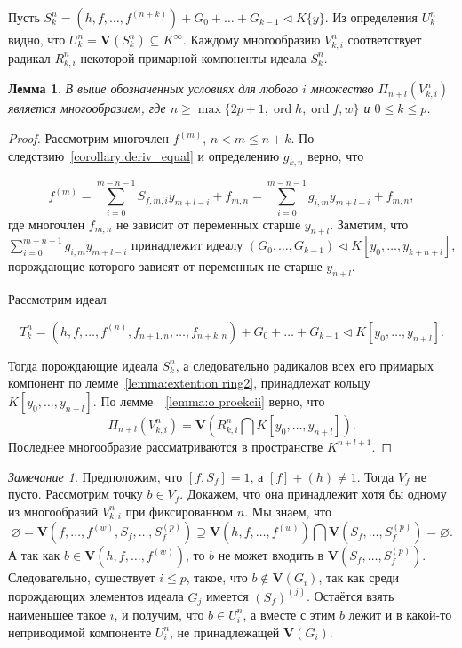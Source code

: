 \documentclass[16pt]{article}
\DeclareMathOperator{\ord}{ord}
\renewcommand{\le}{\leqslant} %
\renewcommand{\ge}{\geqslant} %
\theoremstyle{plain1}
\newtheorem{lemma}[theorem1]{Лемма}
\theoremstyle{plain2}
\theoremstyle{plain}
\theoremstyle{plain3}
\theoremstyle{definition}
\theoremstyle{remark}
\newtheorem{remark}[theorem1]{Замечание}
\begin{document}
Пусть  $S_k^n=\left(h,f,\ldots,f^{(n+k)}\right)+G_0+\ldots+ G_{k-1}\triangleleft K\{y\}$. Из определения ${U}_k^n$ видно, что ${U}_k^n=\mathbf{V}(S_k^n)\subseteq K^{\infty}$. Каждому многообразию ${V}_{k,i}^n$ соответствует радикал $R_{k,i}^n$ некоторой примарной компоненты идеала $S_k^n$.


\begin{lemma} \label{lemma:o_ideale}
 В выше обозначенных условиях для любого $i$ множество $\Pi_{n+l}({V}_{k,i}^n)$ является многообразием, где $n \ge\max\{ 2p+1,\ord{h},\ord{f},w\}$ и  $0\le k\le p$.
\end{lemma}

\begin{proof}
Рассмотрим многочлен $f^{(m)}$, $n<m\le n+k$. По следствию~\ref{corollary:deriv_equal} и определению $g_{k,n}$ верно, что

$$
f^{(m)}= \sum\limits_{i=0}^{m-n-1} S_{f,m,i}y_{m+l -i} + f_{m,n}=\sum\limits_{i=0}^{m-n-1} g_{i,m}y_{m+l -i} + f_{m,n},
$$
где многочлен $f_{m,n}$ не зависит от переменных старше $y_{n+l}$. Заметим, что $\sum\limits_{i=0}^{m-n-1} g_{i,m}y_{m+l -i}$ принадлежит идеалу  $(G_0,\ldots, G_{k-1})\triangleleft K[y_0,\ldots,y_{k+n+l}]$,  порождающие которого зависят от переменных не старше $y_{n+l}$.

Рассмотрим идеал

$$
T_k^n=(h,f,\ldots,f^{(n)},f_{n+1,n},\ldots,f_{n+k,n}) + G_0+\ldots+ G_{k-1}\triangleleft K[y_0,\ldots,y_{n+l}].
$$

Тогда порождающие идеала $S_k^n$, а следовательно радикалов всех его примарых компонент по лемме~\ref{lemma:extention ring2}, принадлежат кольцу $K[y_0,\ldots,y_{n+l}]$. По лемме~~\ref{lemma:o proekcii} верно, что
$$
\Pi_{n+l}({V}_{k,i}^n)=\mathbf{V}(R_{k,i}^n\bigcap K[y_0,\ldots,y_{n+l}]).
$$
Последнее многообразие рассматриваются в пространстве $K^{n+l+1}$.
\end{proof}


\begin{remark}\label{remark:o_prinadleznosti_reshenia}
Предположим, что $[f,S_f]=1$, а $[f]+(h)\neq 1$. Тогда ${V}_{f}$ не пусто. Рассмотрим точку $b\in{V}_{f}$. Докажем, что она принадлежит хотя бы одному из многообразий ${V}_{k,i}^n$ при фиксированном $n$. Мы знаем, что 
$$
\varnothing=\mathbf{V}\left(f,\ldots,f^{(w)},S_f,\ldots,S_f^{(p)}\right)\supseteq \mathbf{V}\left(h,f,\ldots,f^{(w)}\right)\bigcap\mathbf{V}\left(S_f,\ldots,S_f^{(p)}\right)=\varnothing.
$$
 А так как $b\in \mathbf{V}\left(h,f,\ldots,f^{(w)}\right)$, то $b$ не может входить в $\mathbf{V}\left(S_f,\ldots,S_f^{(p)}\right)$.
 Следовательно, существует $i\le p$, такое, что $b \not\in \mathbf{V}(G_i)$, так как среди порождающих элементов идеала $G_j$ имеется $(S_f)^{(j)}$. Остаётся взять наименьшее такое $i$, и получим, что $b\in {U}_{i}^n$, а вместе с этим $b$ лежит и в какой-то неприводимой компоненте ${U}_{i}^n$, не принадлежащей $\mathbf{V}(G_{i})$.
\end{remark}
\end{document}
